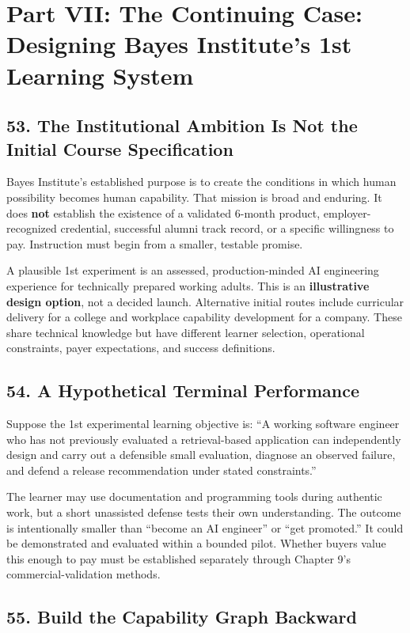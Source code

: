\section*{Part VII: The Continuing Case: Designing Bayes Institute's 1st Learning System}

\subsection*{53. The Institutional Ambition Is Not the Initial Course Specification}

Bayes Institute's established purpose is to create the conditions in which human possibility becomes human capability. That mission is broad and enduring. It does \textbf{not} establish the existence of a validated 6-month product, employer-recognized credential, successful alumni track record, or a specific willingness to pay. Instruction must begin from a smaller, testable promise.

A plausible 1st experiment is an assessed, production-minded AI engineering experience for technically prepared working adults. This is an \textbf{illustrative design option}, not a decided launch. Alternative initial routes include curricular delivery for a college and workplace capability development for a company. These share technical knowledge but have different learner selection, operational constraints, payer expectations, and success definitions.

\subsection*{54. A Hypothetical Terminal Performance}

Suppose the 1st experimental learning objective is: ``A working software engineer who has not previously evaluated a retrieval-based application can independently design and carry out a defensible small evaluation, diagnose an observed failure, and defend a release recommendation under stated constraints.''

The learner may use documentation and programming tools during authentic work, but a short unassisted defense tests their own understanding. The outcome is intentionally smaller than ``become an AI engineer'' or ``get promoted.'' It could be demonstrated and evaluated within a bounded pilot. Whether buyers value this enough to pay must be established separately through Chapter 9's commercial-validation methods.

\subsection*{55. Build the Capability Graph Backward}

